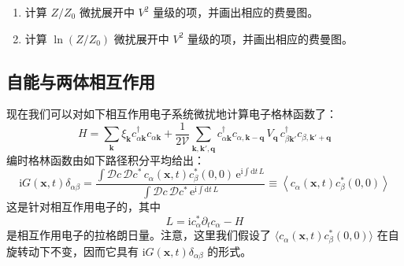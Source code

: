 \begin{enumerate}
\item[(a)] 计算 $Z/Z_{0}$ 微扰展开中 $V^{2}$ 量级的项，并画出相应的费曼图。
\item[(b)] 计算 $\ln(Z/Z_{0})$ 微扰展开中 $V^{2}$ 量级的项，并画出相应的费曼图。
\end{enumerate}

\subsection{自能与两体相互作用}

现在我们可以对如下相互作用电子系统微扰地计算电子格林函数了：
\begin{equation*}
H=\sum_{\pmb{k}}\xi_{\pmb{k}}c_{\alpha\pmb{k}}^{\dagger}c_{\alpha\pmb{k}}+\frac{1}{2\mathcal{V}}\sum_{\pmb{k},\pmb{k}',\pmb{q}}c_{\alpha\pmb{k}}^{\dagger}c_{\alpha,\pmb{k}-\pmb{q}}\,V_{\pmb{q}}\,c_{\beta\pmb{k}'}^{\dagger}c_{\beta,\pmb{k}'+\pmb{q}}
\end{equation*}
编时格林函数由如下路径积分平均给出：
\begin{equation*}
\mathrm{i}G(\pmb{x},t)\delta_{\alpha\beta}=\frac{\int \mathcal{D}c\,\mathcal{D}c^{*}\,c_{\alpha}(\pmb{x},t)c_{\beta}^{*}(0,0)\,\mathrm{e}^{\mathrm{i}\int \mathrm{d}t\,L}}{\int \mathcal{D}c\,\mathcal{D}c^{*}\,\mathrm{e}^{\mathrm{i}\int \mathrm{d}t\,L}}\equiv\left\langle c_{\alpha}(\pmb{x},t)c_{\beta}^{*}(0,0)\right\rangle
\end{equation*}
这是针对相互作用电子的，其中
\begin{equation*}
L=\mathrm{i}c_{\alpha}^{*}\partial_{t}c_{\alpha}-H
\end{equation*}
是相互作用电子的拉格朗日量。注意，这里我们假设了 $\langle c_{\alpha}(\pmb{x},t)c_{\beta}^{*}(0,0)\rangle$ 在自旋转动下不变，因而它具有 $\mathrm{i}G(\pmb{x},t)\delta_{\alpha\beta}$ 的形式。

